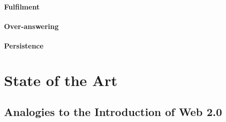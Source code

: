 	\subsubsection*{Fulfilment}
	
	\subsubsection*{Over-answering}

	\subsubsection*{Persistence}

%	










\chapter{State of the Art}
\label{stateofzart}









\section{Analogies to the Introduction of Web 2.0}

